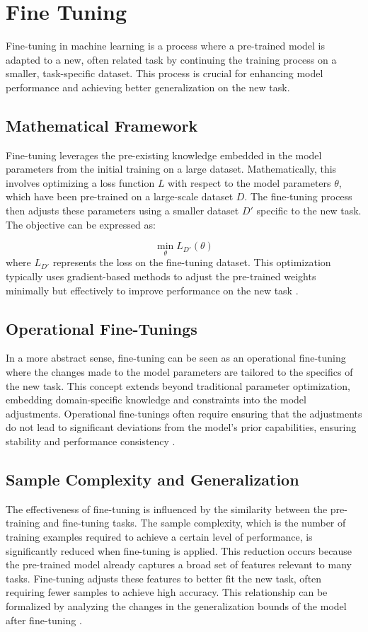 \section{Fine Tuning} %
Fine-tuning in machine learning is a process where a pre-trained model is adapted to a new, often related task by continuing the training process on a smaller, task-specific dataset. This process is crucial for enhancing model performance and achieving better generalization on the new task.

\subsection{Mathematical Framework}
Fine-tuning leverages the pre-existing knowledge embedded in the model parameters from the initial training on a large dataset. Mathematically, this involves optimizing a loss function $L$ with respect to the model parameters $\theta$, which have been pre-trained on a large-scale dataset $D$. The fine-tuning process then adjusts these parameters using a smaller dataset $D'$ specific to the new task. The objective can be expressed as:

\[
\min_{\theta} L_{D'}(\theta)
\]
where $L_{D'}$ represents the loss on the fine-tuning dataset. This optimization typically uses gradient-based methods to adjust the pre-trained weights minimally but effectively to improve performance on the new task \cite{Lalor2017Improving}.

\subsection{Operational Fine-Tunings}
In a more abstract sense, fine-tuning can be seen as an operational fine-tuning where the changes made to the model parameters are tailored to the specifics of the new task. This concept extends beyond traditional parameter optimization, embedding domain-specific knowledge and constraints into the model adjustments. Operational fine-tunings often require ensuring that the adjustments do not lead to significant deviations from the model's prior capabilities, ensuring stability and performance consistency \cite{Catani2020A}.

\subsection{Sample Complexity and Generalization}
The effectiveness of fine-tuning is influenced by the similarity between the pre-training and fine-tuning tasks. The sample complexity, which is the number of training examples required to achieve a certain level of performance, is significantly reduced when fine-tuning is applied. This reduction occurs because the pre-trained model already captures a broad set of features relevant to many tasks. Fine-tuning adjusts these features to better fit the new task, often requiring fewer samples to achieve high accuracy. This relationship can be formalized by analyzing the changes in the generalization bounds of the model after fine-tuning \cite{Shachaf2021A}.

